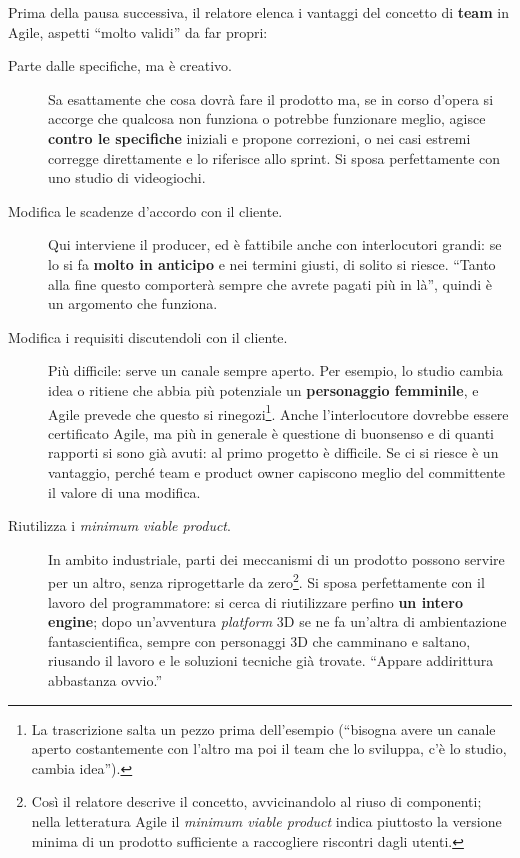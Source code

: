 Prima della pausa successiva, il relatore elenca i vantaggi del concetto di
\textbf{team} in Agile, aspetti ``molto validi'' da far propri:
\begin{description}
  \item[Parte dalle specifiche, ma è creativo.] Sa esattamente che cosa dovrà
        fare il prodotto ma, se in corso d'opera si accorge che qualcosa non
        funziona o potrebbe funzionare meglio, agisce \textbf{contro le
        specifiche} iniziali e propone correzioni, o nei casi estremi corregge
        direttamente e lo riferisce allo sprint. Si sposa perfettamente con uno
        studio di videogiochi.
  \item[Modifica le scadenze d'accordo con il cliente.] Qui interviene il
        producer, ed è fattibile anche con interlocutori grandi: se lo si fa
        \textbf{molto in anticipo} e nei termini giusti, di solito si riesce.
        ``Tanto alla fine questo comporterà sempre che avrete pagati più in
        là'', quindi è un argomento che funziona.
  \item[Modifica i requisiti discutendoli con il cliente.] Più difficile: serve
        un canale sempre aperto. Per esempio, lo studio cambia idea o ritiene
        che abbia più potenziale un \textbf{personaggio femminile}, e Agile
        prevede che questo si rinegozi\footnote{La trascrizione salta un pezzo
        prima dell'esempio (``bisogna avere un canale aperto costantemente con
        l'altro ma poi il team che lo sviluppa, c'è lo studio, cambia idea'').}.
        Anche l'interlocutore dovrebbe essere certificato Agile, ma più in
        generale è questione di buonsenso e di quanti rapporti si sono già avuti:
        al primo progetto è difficile. Se ci si riesce è un vantaggio, perché
        team e product owner capiscono meglio del committente il valore di una
        modifica.
  \item[Riutilizza i \emph{minimum viable product}.] In ambito industriale,
        parti dei meccanismi di un prodotto possono servire per un altro, senza
        riprogettarle da zero\footnote{Così il relatore descrive il concetto,
        avvicinandolo al riuso di componenti; nella letteratura Agile il
        \emph{minimum viable product} indica piuttosto la versione minima di un
        prodotto sufficiente a raccogliere riscontri dagli utenti.}. Si sposa
        perfettamente con il lavoro del programmatore: si cerca di riutilizzare
        perfino \textbf{un intero engine}; dopo un'avventura \emph{platform} 3D
        se ne fa un'altra di ambientazione fantascientifica, sempre con
        personaggi 3D che camminano e saltano, riusando il lavoro e le soluzioni
        tecniche già trovate. ``Appare addirittura abbastanza ovvio.''
\end{description}

